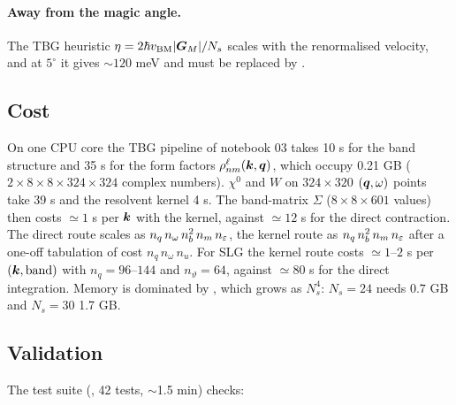 \paragraph{Away from the magic angle.} The TBG heuristic $\eta=2\hbar v_{\rm BM}|\bm G_M|/N_s$ scales with the renormalised
velocity, and at $5^\circ$ it gives $\sim120$ meV and must be replaced by .

\subsection{Cost}

On one CPU core the TBG pipeline of notebook 03 takes 10 s for the band structure and 35 s for the form factors
$\rho^\ell_{nm}(\bm k,\bm q)$, which occupy 0.21 GB ($2\times8\times8\times324\times324$ complex numbers). $\chi^0$ and $W$ on
$324\times320$ $(\bm q,\omega)$ points take 39 s and the resolvent kernel 4 s. The band-matrix $\Sigma$ ($8\times8\times601$ values)
then costs $\simeq1$ s per $\bm k$ with the kernel, against $\simeq12$ s for the direct contraction. The direct route scales as $n_q\,n_\omega\,n_b^2\,n_m\,n_\varepsilon$, the kernel route as
$n_q\,n_b^2\,n_m\,n_\varepsilon$ after a one-off tabulation of cost $n_q\,n_\omega\,n_u$. For SLG the kernel route costs $\simeq1$--$2$ s per $(\bm k,\text{band})$ with $n_q=96$--$144$ and $n_\vartheta=64$, against
$\simeq80$ s for the direct integration. Memory is dominated by
, which grows as $N_s^4$: $N_s=24$ needs $0.7$ GB and $N_s=30$ 1.7 GB.

\subsection{Validation}

The test suite (, 42 tests, $\sim$1.5 min) checks:

